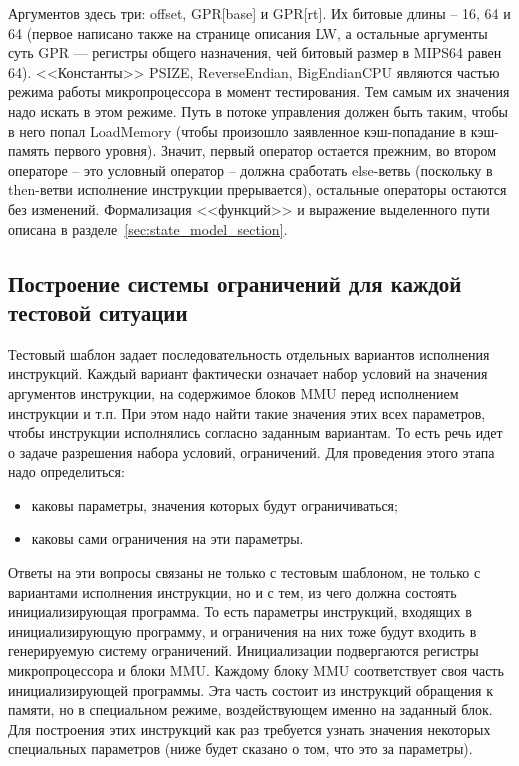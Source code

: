 Аргументов здесь три: offset, GPR[base] и GPR[rt]. Их битовые длины -- 16, 64 и
64 (первое написано также на странице описания LW, а остальные аргументы суть
GPR --- регистры общего назначения, чей битовый размер в MIPS64 равен 64).
<<Константы>> PSIZE, ReverseEndian, BigEndianCPU являются частью режима работы
микропроцессора в момент тестирования. Тем самым их значения надо искать в этом
режиме. Путь в потоке управления должен быть таким, чтобы в него попал
LoadMemory (чтобы произошло заявленное кэш-попадание в кэш-память первого
уровня). Значит, первый оператор остается прежним, во втором операторе -- это
условный оператор -- должна сработать else-ветвь (поскольку в then-ветви
исполнение инструкции прерывается), остальные операторы остаются без изменений.
Формализация <<функций>> и выражение выделенного пути описана в
разделе~\ref{sec:state_model_section}.


\subsection{Построение системы ограничений для каждой тестовой ситуации}

Тестовый шаблон задает последовательность отдельных вариантов исполнения инструкций. Каждый вариант фактически означает набор условий на значения аргументов инструкции, на содержимое блоков MMU перед исполнением инструкции и т.п. При этом надо найти такие значения этих всех параметров, чтобы инструкции исполнялись согласно заданным вариантам. То есть речь идет о задаче разрешения набора условий, ограничений.  Для проведения этого этапа надо определиться:
\begin{itemize}
  \item каковы параметры, значения которых будут ограничиваться;
  \item каковы сами ограничения на эти параметры.
\end{itemize}

Ответы на эти вопросы связаны не только с тестовым шаблоном, не только с вариантами исполнения инструкции, но и с тем, из чего должна состоять инициализирующая программа. То есть параметры инструкций, входящих в инициализирующую программу, и ограничения на них тоже будут входить в генерируемую систему ограничений. Инициализации подвергаются регистры микропроцессора и блоки MMU. Каждому блоку MMU соответствует своя часть инициализирующей программы. Эта часть состоит из инструкций обращения к памяти, но в специальном режиме, воздействующем именно на заданный блок. Для построения этих инструкций как раз требуется узнать значения некоторых специальных параметров (ниже будет сказано о том, что это за параметры).

